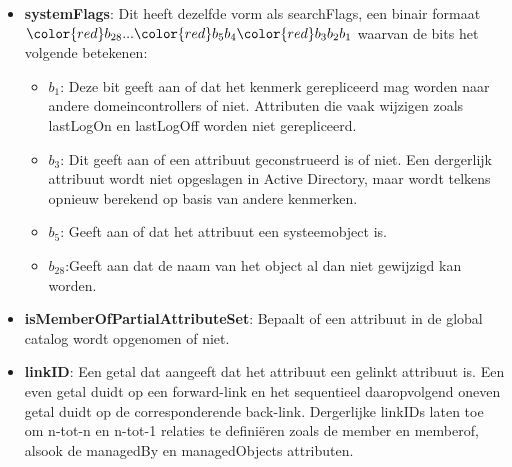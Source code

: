 \begin{enumerate}
{\begin{itemize}
\begin{itemize}
					\item \textbf{$b_8$}: 
					\item \textbf{$b_{10}$}: 
				\end{itemize}
				\item \textbf{systemFlags}: Dit heeft dezelfde vorm als searchFlags, een binair formaat ${\color{red}b_{28}}...{\color{red}b_{5}}b_{4}{\color{red}b_3b_2b_1}$ waarvan de bits het volgende betekenen:
				\begin{itemize}
					\item \textbf{$b_1$}: Deze bit geeft aan of dat het kenmerk gerepliceerd mag worden naar andere domeincontrollers of niet. Attributen die vaak wijzigen zoals lastLogOn en lastLogOff worden niet gerepliceerd.
					\item \textbf{$b_3$}: Dit geeft aan of een attribuut geconstrueerd is of niet. Een dergerlijk attribuut wordt niet opgeslagen in Active Directory, maar wordt telkens opnieuw berekend op basis van andere kenmerken.
					\item \textbf{$b_5$}: Geeft aan of dat het attribuut een systeemobject is.
					\item \textbf{$b_{28}$}:Geeft aan dat de naam van het object al dan niet gewijzigd kan worden. 
				\end{itemize}
				\item \textbf{isMemberOfPartialAttributeSet}: Bepaalt of een attribuut in de global catalog wordt opgenomen of niet.
				\item \textbf{linkID}: Een getal dat aangeeft dat het attribuut een gelinkt attribuut is. Een even getal duidt op een forward-link en het sequentieel daaropvolgend oneven getal duidt op de corresponderende back-link. Dergerlijke linkIDs laten toe om n-tot-n en n-tot-1 relaties te definiëren zoals de member en memberof, alsook de managedBy en managedObjects attributen. 
			\end{itemize}
		}
		

\end{enumerate}
